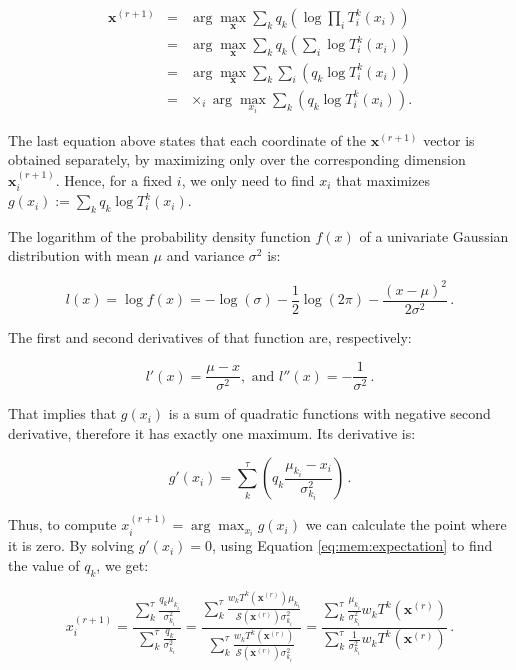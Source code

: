 \begin{eqnarray}
  \label{eq:mem:construction:start}
  \mathbf{x}^{(r+1)} & = & \arg\max_\mathbf{x} \sum_k q_k \left( \log{\prod_i T^k_i(x_i)} \right) \\
  & = & \arg\max_\mathbf{x} \sum_k q_k \left(\sum_i \log{T^k_i(x_i)} \right) \\
  & = & \arg\max_\mathbf{x} \sum_k \sum_i \left(q_k \log{T^k_i(x_i)} \right) \\
  & = & \times_i \arg\max_{x_i} \sum_k \left(q_k \log{T^k_i(x_i)} \right).
\end{eqnarray}

The last equation above states that each coordinate of the $\mathbf{x}^{(r+1)}$ vector is obtained separately, by maximizing only over the corresponding dimension $\mathbf{x}^{(r+1)}_i$. Hence, for a fixed $i$, we only need to find $x_i$ that maximizes $g(x_i) := \sum_k q_k \log{T^k_i(x_i)}$.

The logarithm of the probability density function $f(x)$ of a univariate Gaussian distribution with mean $\mu$ and variance $\sigma^2$ is:

\begin{equation}
  l(x) = \log{f(x)} = -\log(\sigma) - \frac{1}{2} \log(2\pi) - \frac{(x-\mu)^2}{2\sigma^2} \, .
\end{equation}

The first and second derivatives of that function are, respectively:

\begin{equation}
  l'(x)  =  \frac{\mu - x}{\sigma^2}, \text{ and }
  l''(x)  =  -\frac{1}{\sigma^2} \, .
\end{equation}

\noindent That implies that $g(x_i)$ is a sum of quadratic functions with negative second derivative, therefore it has exactly one maximum. Its derivative is:

\begin{equation}
  g'(x_i) = \sum_k^\tau \left( q_k \frac{\mu_{k_i} - x_i}{\sigma_{k_i}^2} \right) \, .
\end{equation}

\noindent Thus, to compute $x^{(r+1)}_i = \arg\max_{x_i} g(x_i)$ we can calculate the point where it is zero. By solving $g'(x_i) = 0$, using Equation \ref{eq:mem:expectation} to find the value of $q_k$, we get:

\begin{equation} \label{eq:memfraction}
  x^{(r+1)}_i = \frac{\sum_k^\tau \frac{q_k \mu_{k_i}}{\sigma_{k_i}^2}}{\sum_k^\tau \frac{q_k}{\sigma_{k_i}^2}}
  = \frac{\sum_k^\tau \frac{w_k T^k\left(\mathbf{x}^{(r)}\right) \mu_{k_i}}{\mathcal{S}\left(\mathbf{x}^{(r)}\right) \sigma_{k_i}^2}}{\sum_k^\tau \frac{w_k T^k\left(\mathbf{x}^{(r)}\right)}{\mathcal{S}\left(\mathbf{x}^{(r)}\right) \sigma_{k_i}^2}}
  =   \frac{\sum_k^\tau \frac{\mu_{k_i}}{\sigma_{k_i}^2} w_k T^k\left(\mathbf{x}^{(r)}\right)}{\sum_k^\tau \frac{1}{\sigma_{k_i}^2} w_k T^k\left(\mathbf{x}^{(r)}\right)} \, .
\end{equation}

